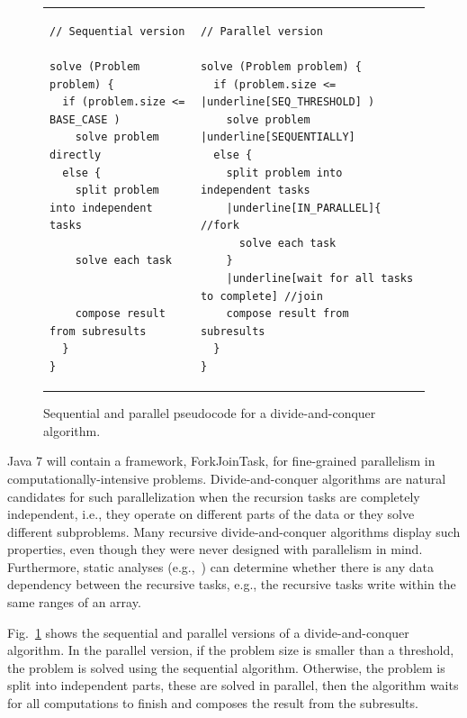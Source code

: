 \documentclass[10pt,twocolumn]{article}
\newenvironment{CodeOut}{\begin{scriptsize}}{\end{scriptsize}}
\newcommand{\MaxWidth}{\columnwidth}
\begin{document}
\begin{figure}[th]
\vspace{-0.2 in}
\begin{CodeOut}
\begin{tabular}{@{}l|l@{}}
\begin{minipage}[t]{\MaxWidth}
\begin{Verbatim}
// Sequential version

solve (Problem problem) {
  if (problem.size <= BASE_CASE )
    solve problem directly
  else {
    split problem into independent tasks
    
    solve each task
    
    
    compose result from subresults
  }
}
\end{Verbatim}
\end{minipage}
&
\begin{minipage}[t]{\MaxWidth}
\begin{Verbatim}[commandchars=\|\[\]]
// Parallel version

solve (Problem problem) {
  if (problem.size <= |underline[SEQ_THRESHOLD] )
    solve problem |underline[SEQUENTIALLY]
  else {
    split problem into independent tasks
    |underline[IN_PARALLEL]{ //fork
      solve each task 
    } 
    |underline[wait for all tasks to complete] //join
    compose result from subresults
  }
}
\end{Verbatim}
\end{minipage}
\end{tabular}
\end{CodeOut}
\caption{Sequential and parallel pseudocode for a divide-and-conquer algorithm.}
\label{fig:DivideAndConquer}
\end{figure}

Java 7 will contain a framework, ForkJoinTask, for fine-grained 
parallelism in computationally-intensive problems. Divide-and-conquer
algorithms are natural candidates for such parallelization when the recursion
tasks are completely independent, i.e., they operate on different parts of the
data or they solve different subproblems. Many recursive divide-and-conquer
algorithms display such properties, even though they were never designed with
parallelism in mind. Furthermore, static analyses (e.g.,~\cite{Rugina'99:automaticParallelization})
can determine whether there is any data dependency between the recursive tasks,
e.g., the recursive tasks write within the same ranges of an array.

Fig.~\ref{fig:DivideAndConquer} shows the sequential and parallel
versions of a divide-and-conquer algorithm. In the parallel version,
if the problem size is smaller than a threshold, the problem is solved using
the sequential algorithm. Otherwise, the problem is split into independent
parts, these are solved in parallel, then the algorithm waits for all
computations to finish and composes the result from the subresults.
\end{document}
